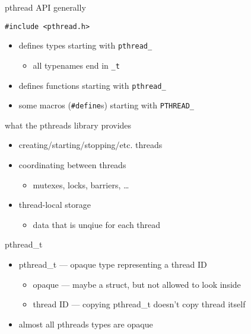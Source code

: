 \begin{frame}[fragile,label=pthreadApi]{pthread API generally}
\begin{lstlisting}
#include <pthread.h>
\end{lstlisting}
\begin{itemize}
\item defines types starting  with \texttt{pthread\_}
    \begin{itemize}
    \item all typenames end in \texttt{\_t}
    \end{itemize}
\item defines functions starting with \texttt{pthread\_}
\item some macros (\texttt{\#define}s) starting with \texttt{PTHREAD\_}
\end{itemize}
\end{frame}

\begin{frame}[fragile,label=pthreadsWhat]{what the pthreads library provides}
\begin{itemize}
\item creating/starting/stopping/etc. threads
\item coordinating between threads
    \begin{itemize}
    \item mutexes, locks, barriers, \ldots
    \end{itemize}
\item thread-local storage
    \begin{itemize}
    \item data that is unqiue for each thread
    \end{itemize}
\end{itemize}
\end{frame}

\begin{frame}[fragile,label=pthreadT]{pthread\_t}
\begin{itemize}
\item pthread\_t --- opaque type representing a thread ID
    \begin{itemize}
    \item opaque --- maybe a struct, but not allowed to look inside
    \item thread ID --- copying pthread\_t doesn't copy thread itself
    \end{itemize}
\vspace{.5cm}
\item<2-> almost all pthreads types are opaque
\end{itemize}
\end{frame}
